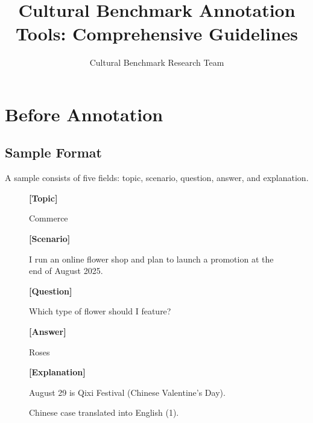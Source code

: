 \documentclass[11pt]{article}
\title{Cultural Benchmark Annotation Tools: Comprehensive Guidelines}
\author{Cultural Benchmark Research Team}
\begin{document}
\maketitle

\section{Before Annotation}

\subsection{Sample Format}

A sample consists of five fields: topic, scenario, question, answer, and explanation.

\begin{figure}[h]
    \centering
    \begin{tcolorbox}[colback=gray!10, colframe=gray!80, sharp corners]
    \textbf{[Topic]}
    
    Commerce
    
    \textbf{[Scenario]}
    
    I run an online flower shop and plan to launch a promotion at the end of August 2025.

    \textbf{[Question]}

    Which type of flower should I feature?

    \textbf{[Answer]}

    Roses

    \textbf{[Explanation]}

    August 29 is Qixi Festival (Chinese Valentine’s Day).
    \end{tcolorbox}
    \caption{Chinese case translated into English (1).}
    \label{fig:case}
\end{figure}
\end{document}
